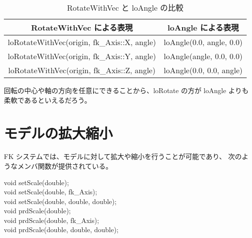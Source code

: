 \begin{table}[H]
\caption{RotateWithVec と loAngle の比較}
\label{tbl:fkAngle1}
\begin{center}
\begin{tabular}{|c|c|}
\hline
RotateWithVec による表現 & loAngle による表現 \\ \hline \hline
loRotateWithVec(origin, fk\_Axis::X, angle) & loAngle(0.0, angle, 0.0) \\ \hline
loRotateWithVec(origin, fk\_Axis::Y, angle) & loAngle(angle, 0.0, 0.0) \\ \hline
loRotateWithVec(origin, fk\_Axis::Z, angle) & loAngle(0.0, 0.0, angle) \\ \hline
\end{tabular}
\end{center}
\end{table}

回転の中心や軸の方向を任意にできることから、loRotate の方が loAngle よりも
柔軟であるといえるだろう。
\section{モデルの拡大縮小}
FK システムでは、モデルに対して拡大や縮小を行うことが可能であり、
次のようなメンバ関数が提供されている。
\begin{description}
\item[void setScale(double);]
\item[void setScale(double, fk\_Axis);]
\item[void setScale(double, double, double);]
\item[void prdScale(double);]
\item[void prdScale(double, fk\_Axis);]
\item[void prdScale(double, double, double);]
\end{description}

